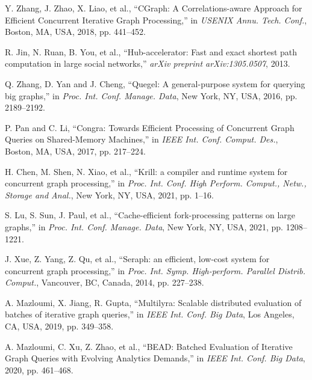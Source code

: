 \documentclass[lettersize,journal]{IEEEtran}
\begin{document}
\begin{thebibliography}{100}
Y. Zhang, J. Zhao, X. Liao, et al., ``{CGraph}: A Correlations-aware Approach for Efficient Concurrent Iterative Graph Processing,'' in \textit{USENIX Annu. Tech. Conf.}, Boston, MA, USA, 2018, pp. 441--452.

R. Jin, N. Ruan, B. You, et al., ``Hub-accelerator: Fast and exact shortest path computation in large social networks,'' \textit{arXiv preprint arXiv:1305.0507}, 2013.

Q. Zhang, D. Yan and J. Cheng, ``Quegel: A general-purpose system for querying big graphs,'' in \textit{Proc. Int. Conf. Manage. Data}, New York, NY, USA, 2016, pp. 2189--2192.

P. Pan and C. Li, ``Congra: Towards Efficient Processing of Concurrent Graph Queries on Shared-Memory Machines,'' in \textit{IEEE Int. Conf. Comput. Des.}, Boston, MA, USA, 2017, pp. 217--224.

H. Chen, M. Shen, N. Xiao, et al., ``Krill: a compiler and runtime system for concurrent graph processing,'' in \textit{Proc. Int. Conf. High Perform. Comput., Netw., Storage and Anal.}, New York, NY, USA, 2021, pp. 1--16.

S. Lu, S. Sun, J. Paul, et al., ``Cache-efficient fork-processing patterns on large graphs,'' in \textit{Proc. Int. Conf. Manage. Data}, New York, NY, USA, 2021, pp. 1208--1221.

J. Xue, Z. Yang, Z. Qu, et al., ``Seraph: an efficient, low-cost system for concurrent graph processing,'' in \textit{Proc. Int. Symp. High-perform. Parallel Distrib. Comput.}, Vancouver, BC, Canada, 2014, pp. 227--238.

A. Mazloumi, X. Jiang, R. Gupta, ``Multilyra: Scalable distributed evaluation of batches of iterative graph queries,'' in \textit{IEEE Int. Conf. Big Data}, Los Angeles, CA, USA, 2019, pp. 349--358.

A. Mazloumi, C. Xu, Z. Zhao, et al., ``BEAD: Batched Evaluation of Iterative Graph Queries with Evolving Analytics Demands,'' in \textit{IEEE Int. Conf. Big Data}, 2020, pp. 461--468.




\end{thebibliography}
\end{document}
